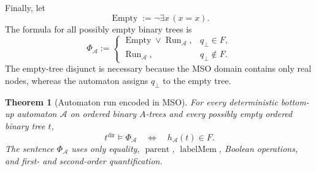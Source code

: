 \documentclass[11pt]{article}
\newtheorem{theorem}{Theorem}
\theoremstyle{definition}
\newcommand{\Aut}{\mathcal A}
\begin{document}
Finally, let
\[
  \operatorname{Empty}:=\neg\exists x\,(x=x).
\]
The formula for all possibly empty binary trees is
\begin{equation}
\label{eq:automaton-mso-sentence}
  \Phi_\Aut:=
  \begin{cases}
    \operatorname{Empty}\vee\operatorname{Run}_\Aut,
      & q_\bot\in F,\\
    \operatorname{Run}_\Aut,
      & q_\bot\notin F.
  \end{cases}
\end{equation}
The empty-tree disjunct is necessary because the MSO domain contains only real
nodes, whereas the automaton assigns \(q_\bot\) to the empty tree.

\begin{theorem}[Automaton run encoded in MSO]
\label{thm:automaton-to-mso-ordered-binary}
For every deterministic bottom-up automaton \(\Aut\) on ordered binary
\(A\)-trees and every possibly empty ordered binary tree \(t\),
\begin{equation}
\label{eq:automaton-mso-correctness}
  t^{\mathrm{dir}}\models\Phi_\Aut
  \quad\Longleftrightarrow\quad
  h_\Aut(t)\in F.
\end{equation}
The sentence \(\Phi_\Aut\) uses only equality,
\(\operatorname{parent}\), \(\operatorname{labelMem}\), Boolean operations,
and first- and second-order quantification.
\end{theorem}
\end{document}
